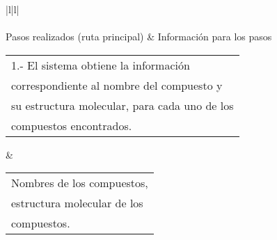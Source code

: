 \begin{longtable}{|l|l|}
                                                                                \\ \hline
{}                                                                                                                                                                                                                                                                                                                                                  \\ \hline
Pasos realizados (ruta principal)                                                                                                                                                                                                                                                       & Información para los pasos                                                                                     \\ \hline
\begin{tabular}[c]{@{}l@{}}1.- El sistema obtiene la información\\ correspondiente al nombre del compuesto y\\ su estructura molecular, para cada uno de los\\ compuestos encontrados.\end{tabular}                                                                                     & \begin{tabular}[c]{@{}l@{}}Nombres de los compuestos,\\ estructura molecular de los\\ compuestos.\end{tabular} \\ \hline

\end{longtable}
